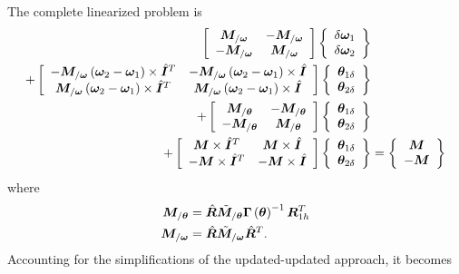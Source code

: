 \documentclass[10pt,dvips,fleqn,subeqn]{report}
\newcommand{\T}[1]{\bm{#1}}
\begin{document}
The complete linearized problem is
\begin{align}
	\sqbr{\matr{cc}{
		\T{M}_{/\T{\omega}} & - \T{M}_{/\T{\omega}} \\
		- \T{M}_{/\T{\omega}} & \T{M}_{/\T{\omega}}
	}} \cubr{\cvvect{
		\delta\T{\omega}_1 \\
		\delta\T{\omega}_2
	}} & \nonumber \\
	+ \sqbr{\matr{cc}{
		- \T{M}_{/\T{\omega}} \plbr{\T{\omega}_2 - \T{\omega}_1}\times \hat{\T{I}}^T
			& - \T{M}_{/\T{\omega}} \plbr{\T{\omega}_2 - \T{\omega}_1}\times \hat{\T{I}} \\
		\T{M}_{/\T{\omega}} \plbr{\T{\omega}_2 - \T{\omega}_1}\times \hat{\T{I}}^T
			& \T{M}_{/\T{\omega}} \plbr{\T{\omega}_2 - \T{\omega}_1}\times \hat{\T{I}}
	}} \cubr{\cvvect{
		\T{\theta}_{1\delta} \\
		\T{\theta}_{2\delta}
	}} & \nonumber \\
	+ \sqbr{\matr{cc}{
		\T{M}_{/\T{\theta}} & - \T{M}_{/\T{\theta}} \\
		- \T{M}_{/\T{\theta}} & \T{M}_{/\T{\theta}}
	}} \cubr{\cvvect{
		\T{\theta}_{1\delta} \\
		\T{\theta}_{2\delta}
	}} & \nonumber \\
	+ \sqbr{\matr{cc}{
		\T{M} \times \hat{\T{I}}^T & \T{M} \times \hat{\T{I}} \\
		- \T{M} \times \hat{\T{I}}^T & - \T{M} \times \hat{\T{I}}
	}} \cubr{\cvvect{
		\T{\theta}_{1\delta} \\
		\T{\theta}_{2\delta}
	}} &= \cubr{\cvvect{
		\T{M} \\
		- \T{M}
	}}
\end{align}
where
\begin{subequations}
\begin{align}
	\T{M}_{/\T{\theta}} &= \hat{\T{R}} \tilde{\T{M}}_{/\T{\theta}} \T{\Gamma}\plbr{\T{\theta}}^{-1} \T{R}_{1h}^T \\
	\T{M}_{/\T{\omega}} &= \hat{\T{R}} \tilde{\T{M}}_{/\T{\omega}} \hat{\T{R}}^T .
\end{align}
\end{subequations}
Accounting for the simplifications of the updated-updated approach, it becomes
\end{document}
